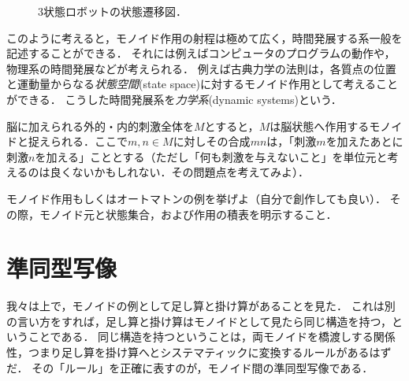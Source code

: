 \documentclass[11pt,a4paper, dvipdfmx]{jsarticle}
\begin{document}
\begin{figure}
    \begin{center}
      \end{center}
      \caption{3状態ロボットの状態遷移図．}
      \label{robot}
\end{figure}

 
このように考えると，モノイド作用の射程は極めて広く，時間発展する系一般を記述することができる．
それには例えばコンピュータのプログラムの動作や，物理系の時間発展などが考えられる．
例えば古典力学の法則は，各質点の位置と運動量からなる\emph{状態空間}(state space)に対するモノイド作用として考えることができる．
こうした時間発展系を\emph{力学系}(dynamic systems)という．



\begin{example}
    脳に加えられる外的・内的刺激全体を$M$とすると，$M$は脳状態へ作用するモノイドと捉えられる．ここで$m, n \in M$に対しその合成$mn$は，「刺激$m$を加えたあとに刺激$n$を加える」こととする（ただし「何も刺激を与えないこと」を単位元と考えるのは良くないかもしれない．その問題点を考えてみよ）．
\end{example}

\begin{exercise}
モノイド作用もしくはオートマトンの例を挙げよ（自分で創作しても良い）．
その際，モノイド元と状態集合，および作用の積表を明示すること．
\end{exercise}



\section{準同型写像}
我々は上で，モノイドの例として足し算と掛け算があることを見た．
これは別の言い方をすれば，足し算と掛け算はモノイドとして見たら同じ構造を持つ，ということである．
同じ構造を持つということは，両モノイドを橋渡しする関係性，つまり足し算を掛け算へとシステマティックに変換するルールがあるはずだ．
その「ルール」を正確に表すのが，モノイド間の準同型写像である．
\end{document}
